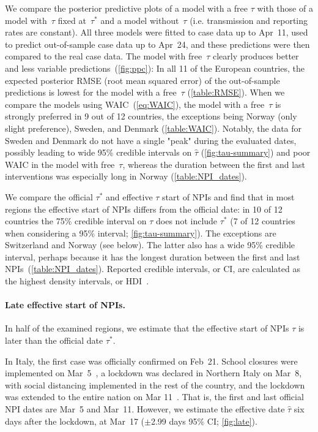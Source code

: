 \documentclass[12pt]{extarticle}
\begin{document}
We compare the posterior predictive plots of a model with a free $\tau$ with those of a model with~$\tau$ fixed at~$\tau^*$ and a model without~$\tau$ (i.e. transmission and reporting rates are constant).
All three models were fitted to case data up to Apr~11, used to predict out-of-sample case data up to Apr~24, and these predictions were then compared to the real case data. 
The model with free~$\tau$ clearly produces better and less variable predictions~(\autoref{fig:ppc}):
In all 11 of the European countries, the expected posterior RMSE (root mean squared error) of the out-of-sample predictions is lowest for the model with a free~$\tau$ (\autoref{table:RMSE}).
When we compare the models using WAIC~(\autoref{eq:WAIC}), the model with a free~$\tau$ is strongly preferred in 9 out of 12 countries, the exceptions being Norway (only slight preference), Sweden, and Denmark (\autoref{table:WAIC}).
Notably, the data for Sweden and Denmark do not have a single "peak" during the evaluated dates, possibly leading to wide 95\% credible intervals on $\hat{\tau}$ (\autoref{fig:tau-summary}) and poor WAIC in the model with free~$\tau$, whereas the duration between the first and last interventions was especially long in Norway (\autoref{table:NPI_dates}).

We compare the official $\tau^*$ and effective $\tau$ start of NPIs and find that in most regions the effective start of NPIs differs from the official date: in 10 of 12 countries the 75\% credible interval on $\tau$ does not include $\tau^*$ (7 of 12 countries when considering a 95\% interval; \autoref{fig:tau-summary}).
The exceptions are Switzerland and Norway (see below).
The latter also has a wide 95\% credible interval, perhaps because it has the longest duration between the first and last NPIs~(\autoref{table:NPI_dates}).
Reported credible intervals, or CI, are calculated as the highest density intervals, or HDI~\citep{Kruschke2015}.


\paragraph*{Late effective start of NPIs.}
In half of the examined regions, we estimate that the effective start of NPIs $\tau$ is later than the official date $\tau^*$.
 
In Italy, the first case was officially confirmed on Feb~21. School closures were implemented on Mar~5~\citep{Flaxman2020}, a lockdown was declared in Northern Italy on Mar~8, with social distancing implemented in the rest of the country, and the lockdown was extended to the entire nation on Mar 11~\citep{Gatto2020}.
That is, the first and last official NPI dates are Mar~5 and Mar~11.
However, we estimate the effective date $\hat{\tau}$ six days after the lockdown, at Mar~17 ($\pm$2.99 days 95\% CI; \autoref{fig:late}). 
\end{document}

